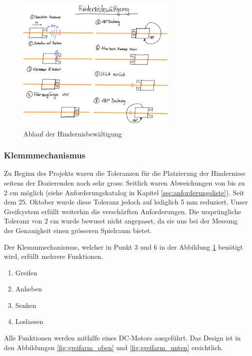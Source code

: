 \documentclass[../main.tex]{subfiles}
\begin{document}
\begin{figure}[H]
\centering
\includegraphics[width=0.7\textwidth]{img/lösungskonzpet/Skizzen/Skizze_Hindernisbewältigung.png}
\caption{Ablauf der Hindernisbewältigung}
\label{img:Skizze_Hindernisbewältigung}
\end{figure}


\subsubsection{Klemmmechanismus}

Zu Beginn des Projekts waren die Toleranzen für die Platzierung der Hindernisse seitens der Dozierenden noch sehr gross: Seitlich waren Abweichungen von bis zu 2 cm möglich (siehe Anforderungskatalog in Kapitel \ref{sec:anforderungsliste}). Seit dem 25. Oktober wurde diese Toleranz jedoch auf lediglich 5 mm reduziert. Unser Greifsystem erfüllt weiterhin die verschärften Anforderungen. Die ursprüngliche Toleranz von 2 cm wurde bewusst nicht angepasst, da sie uns bei der Messung der Genauigkeit einen grösseren Spielraum bietet.

Der Klemmmechanismus, welcher in Punkt 3 und 6 in der Abbildung \ref{img:Skizze_Hindernisbewältigung} benötigt wird, erfüllt mehrere Funktionen.

\begin{enumerate}
    \item Greifen
    \item Anheben
    \item Senken
    \item Loslassen
\end{enumerate}

Alle Funktionen werden mithilfe eines DC-Motors ausgeführt. Das Design ist in den Abbildungen \ref{fig:greifarm_oben} und \ref{fig:greifarm_unten} ersichtlich.
\newline
\end{document}

